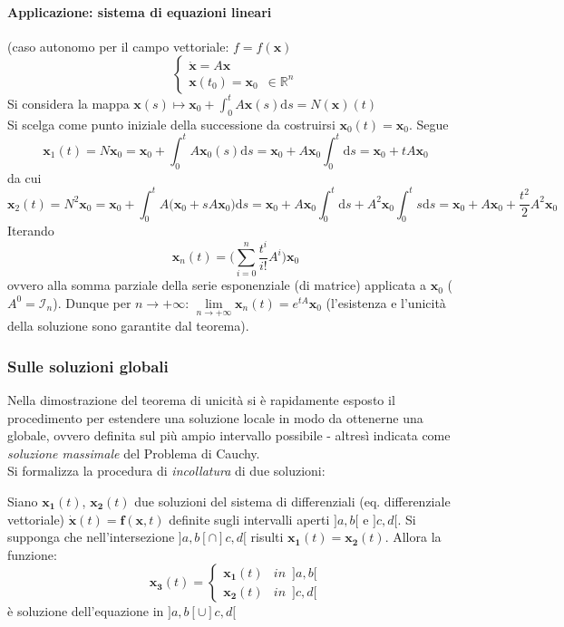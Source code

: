 \documentclass[10pt]{article}
\theoremstyle{plain}
\begin{document}
\paragraph{Applicazione: sistema di equazioni lineari}
(caso autonomo per il campo vettoriale: $f = f(\mathbf{x})$
\[\begin{cases}
\dot{\mathbf{x}} = A \mathbf{x}\\
\mathbf{x}(t_0) = \mathbf{x}_0 \enspace \in \mathbb{R}^n
\end{cases}\]
Si considera la mappa $\displaystyle \mathbf{x}(s) \longmapsto \mathbf{x}_0 + \int_{0}^{t}A \mathbf{x}(s)\textrm{d}s = N(\mathbf{x})(t)$
\\Si scelga come punto iniziale della successione da costruirsi $\mathbf{x}_0(t) = \mathbf{x}_0$. Segue 
\[\mathbf{x}_1(t) = N \mathbf{x}_0 = \mathbf{x}_0 + \int_{0}^{t}A  \mathbf{x}_0(s)\textrm{d}s = \mathbf{x}_0 + A \mathbf{x}_0\int_{0}^{t}\textrm{d}s = \mathbf{x}_0 + t A \mathbf{x}_0\]
da cui
\[\mathbf{x}_2(t) = N^2 \mathbf{x}_0 = \mathbf{x}_0 + \int_{0}^{t}A \big(\mathbf{x}_0 + sA\mathbf{x}_0\big)\textrm{d}s = \mathbf{x}_0 + A \mathbf{x}_0\int_{0}^{t}\textrm{d}s + A^2\mathbf{x}_0\int_{0}^{t}s\textrm{d}s = \mathbf{x}_0 + A \mathbf{x}_0 + \frac{t^2}{2}A^2 \mathbf{x}_0\]
Iterando
\[\mathbf{x}_n(t) = \big(\sum\limits_{i=0}^n \frac{t^i}{i!}A^i\big)\mathbf{x}_0\]
ovvero alla somma parziale della serie esponenziale (di matrice) applicata a $\mathbf{x}_0$ ($A^0 = \mathcal{I}_n$). Dunque per $n \rightarrow +\infty$: $\lim\limits_{n \rightarrow +\infty} \mathbf{x}_n(t) = e^{tA}\mathbf{x}_0$ (l'esistenza e l'unicità della soluzione sono garantite dal teorema).

\subsubsection{Sulle soluzioni globali}
Nella dimostrazione del teorema di unicità si è rapidamente esposto il procedimento per estendere una soluzione locale in modo da ottenerne una globale, ovvero definita sul più ampio intervallo possibile - altresì indicata come \textit{soluzione massimale} del Problema di Cauchy.
\\Si formalizza la procedura di \textit{incollatura} di due soluzioni:
\begin{prop}
Siano $\mathbf{x_1}(t)$, $\mathbf{x_2}(t)$ due soluzioni del sistema di differenziali (eq. differenziale vettoriale) $\dot{\mathbf{x}}(t) = \mathbf{f}(\mathbf{x}, t)$ definite sugli intervalli aperti $]a,b[$ e $]c,d[$. Si supponga che nell'intersezione $]a,b[ \cap ]c,d[$ risulti $\mathbf{x_1}(t) = \mathbf{x_2}(t)$. Allora la funzione:
\[\mathbf{x_3}(t) = \begin{cases}
\mathbf{x_1}(t) & in \enspace ]a,b[\\
\mathbf{x_2}(t) & in \enspace ]c,d[
\end{cases}\]
è soluzione dell'equazione in $]a,b[ \cup ]c,d[$
\end{prop}
\end{document}
